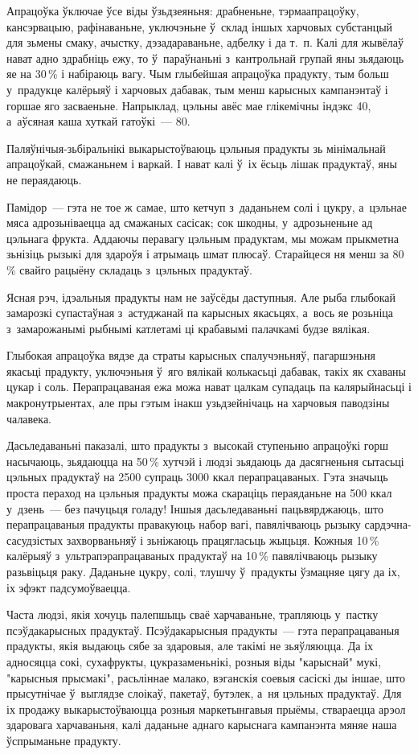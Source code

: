 Апрацоўка ўключае ўсе віды ўзьдзеяньня: драбненьне, тэрмаапрацоўку, кансэрвацыю, рафінаваньне, уключэньне ў~склад іншых харчовых субстанцый для зьмены смаку, ачыстку, дэзадараваньне, адбелку і да т.~п. Калі для жывёлаў нават адно здрабніць ежу, то ў~параўнаньні з~кантрольнай групай яны зьядаюць яе на 30\,\% і набіраюць вагу. Чым глыбейшая апрацоўка прадукту, тым больш у~прадукце калёрыяў і харчовых дабавак, тым менш карысных кампанэнтаў і горшае яго засваеньне. Напрыклад, цэльны авёс мае глікемічны індэкс 40, а~аўсяная каша хуткай гатоўкі~--- 80.

Паляўнічыя-зьбіральнікі выкарыстоўваюць цэльныя прадукты зь мінімальнай апрацоўкай, смажаньнем і варкай. І нават калі ў~іх ёсьць лішак прадуктаў, яны не пераядаюць.

Памідор~--- гэта не тое ж самае, што кетчуп з~даданьнем солі і цукру, а~цэльнае мяса адрозьніваецца ад смажаных сасісак; сок шкодны, у~адрозьненьне ад цэльнага фрукта. Аддаючы перавагу цэльным прадуктам, мы можам прыкметна зьнізіць рызыкі для здароўя і атрымаць шмат плюсаў. Старайцеся ня менш за 80\,\% свайго рацыёну складаць з~цэльных прадуктаў.

Ясная рэч, ідэальныя прадукты нам не заўсёды даступныя. Але рыба глыбокай замарозкі супастаўная з~астуджанай па карысных якасьцях, а~вось яе розьніца з~замарожанымі рыбнымі катлетамі ці крабавымі палачкамі будзе вялікая.

Глыбокая апрацоўка вядзе да страты карысных спалучэньняў, пагаршэньня якасьці прадукту, уключэньня ў~яго вялікай колькасьці дабавак, такіх як схаваны цукар і соль. Перапрацаваная ежа можа нават цалкам супадаць па калярыйнасьці і макронутрыентах, але пры гэтым інакш узьдзейнічаць на харчовыя паводзіны чалавека.

Дасьледаваньні паказалі, што прадукты з~высокай ступеньню апрацоўкі горш насычаюць, зьядаюцца на 50\,\% хутчэй і людзі зьядаюць да дасягненьня сытасьці цэльных прадуктаў на 2500 супраць 3000 ккал перапрацаваных. Гэта значыць проста пераход на цэльныя прадукты можа скараціць пераяданьне на 500 ккал у~дзень~--- без пачуцьця голаду! Іншыя дасьледаваньні пацьвярджаюць, што перапрацаваныя прадукты правакуюць набор вагі, павялічваюць рызыку сардэчна-сасудзістых захворваньняў і зьніжаюць працягласьць жыцьця. Кожныя 10\,\% калёрыяў з~ультрапэрапрацаваных прадуктаў на 10\,\% павялічваюць рызыку разьвіцьця раку. Даданьне цукру, солі, тлушчу ў~прадукты ўзмацняе цягу да іх, іх эфэкт падсумоўваецца.

Часта людзі, якія хочуць палепшыць сваё харчаваньне, трапляюць у~пастку псэўдакарысных прадуктаў. Псэўдакарысныя прадукты~--- гэта перапрацаваныя прадукты, якія выдаюць сябе за здаровыя, але такімі не зьяўляюцца. Да іх адносяцца сокі, сухафрукты, цукразаменьнікі, розныя віды "карыснай" мукі, "карысныя прысмакі", расьліннае малако, вэганскія соевыя сасіскі ды іншае, што прысутнічае ў~выглядзе слоікаў, пакетаў, бутэлек, а~ня цэльных прадуктаў. Для іх продажу выкарыстоўваюцца розныя маркетынгавыя прыёмы, ствараецца арэол здаровага харчаваньня, калі даданьне аднаго карыснага кампанэнта мяняе наша ўспрыманьне прадукту.

